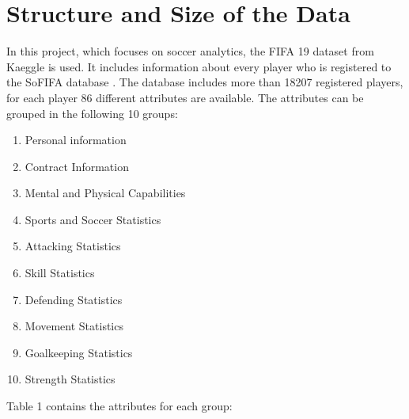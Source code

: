 \documentclass[runningheads]{llncs}
\begin{document}
\section{Structure and Size of the Data}
In this project, which focuses on soccer analytics, the FIFA 19 dataset from Kaeggle is used. It includes information about every player who is registered to the SoFIFA database \cite{ref_sofifa}. 
The database includes more than 18207 registered players, for each player 86 different attributes are available. The attributes can be grouped in the following 10 groups: 
\begin{multicols}{2}
	\begin{enumerate}
	\item Personal information
	\item Contract Information
	\item Mental and Physical Capabilities
	\item Sports and Soccer Statistics
	\item Attacking Statistics  
	\item Skill Statistics
	\item Defending Statistics
	\item Movement Statistics
	\item Goalkeeping Statistics
	\item Strength Statistics
\end{enumerate}
\end{multicols}

Table 1 contains the attributes for each group:
\end{document}
